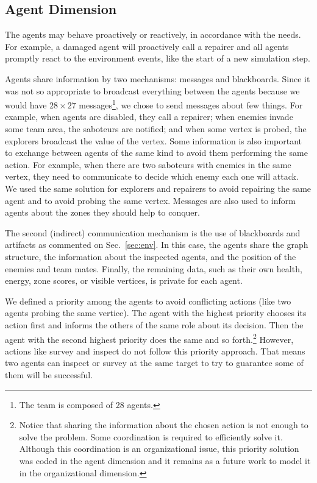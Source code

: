 \subsection{Agent Dimension}

The agents may behave proactively or reactively, in accordance with the needs. For example, a damaged agent will proactively call a repairer and all agents promptly react to the environment events, like the start of a new  simulation step. 

Agents share information by two mechanisms: messages and blackboards. Since it was not so appropriate to broadcast everything between the agents because we would have $28 \times 27$ messages\footnote{The team is composed of 28 agents.}, we chose to send messages about few things. For example, when agents are disabled, they call a repairer; when enemies invade some team area, the saboteurs are notified; and when some vertex is probed, the explorers broadcast the value of the vertex. Some information is also important to exchange between agents of the same kind to avoid them performing the same action. For example, when there are two saboteurs with enemies in the same vertex, they need to communicate to decide which enemy each one will attack. We used the same solution for explorers and repairers to avoid repairing the same agent and to avoid probing the same vertex. Messages are also used to inform agents about the zones they should help to conquer.

The second (indirect) communication mechanism is the use of blackboards and artifacts as commented on Sec.~\ref{sec:env}. In this case, the agents share the graph structure, the information about the inspected agents, and the position of the enemies and team mates. Finally, the remaining data, such as their own health, energy, zone scores, or visible vertices, is private for each agent.

We defined a priority among the agents to avoid conflicting actions (like two agents probing the same vertice). The agent with the highest priority chooses its action first and informs the others of the same role about its decision. Then the agent with the second highest priority does the same and so forth.\footnote{Notice that sharing the information about the chosen action is not enough to solve the problem. Some coordination is required to efficiently solve it. Although this coordination is an organizational issue, this priority solution was coded in the agent dimension and it remains as a future work to model it in the organizational dimension.} However, actions like survey and inspect do not follow this priority approach. That means two agents can inspect or survey at the same target to try to guarantee some of them will be successful. 

